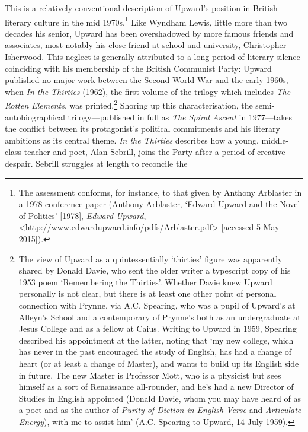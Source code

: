 \documentclass[]{article}
\begin{document}
\noindent This is a relatively conventional description of Upward’s
position in British literary culture in the mid 1970s.\footnote{The
  assessment conforms, for instance, to that given by Anthony Arblaster
  in a 1978 conference paper (Anthony Arblaster, ‘Edward Upward and the
  Novel of Politics’ {[}1978{]}, \emph{Edward Upward},
  \textless{}http://www.edwardupward.info\slash pdfs\slash Arblaster.pdf\textgreater{}
  {[}accessed 5 May 2015{]}).} Like Wyndham Lewis, little more than two
decades his senior, Upward has been overshadowed by more famous friends
and associates, most notably his close friend at school and university,
Christopher Isherwood. This neglect is generally attributed to a long
period of literary silence coinciding with his membership of the British
Communist Party: Upward published no major work between the Second World
War and the early 1960s, when \emph{In the Thirties} (1962), the first
volume of the trilogy which includes \emph{The Rotten Elements}, was
printed.\footnote{The view of Upward as a quintessentially ‘thirties’
  figure was apparently shared by Donald Davie, who sent the older
  writer a typescript copy of his 1953 poem ‘Remembering the Thirties’.
  Whether Davie knew Upward personally is not clear, but there is at
  least one other point of personal connection with Prynne, via A.C.
  Spearing, who was a pupil of Upward’s at Alleyn’s School and a
  contemporary of Prynne’s both as an undergraduate at Jesus College and
  as a fellow at Caius. Writing to Upward in 1959, Spearing described
  his appointment at the latter, noting that ‘my new college, which has
  never in the past encouraged the study of English, has had a change of
  heart (or at least a change of Master), and wants to build up its
  English side in future. The new Master is Professor Mott, who is a
  physicist but sees himself as a sort of Renaissance all-rounder, and
  he’s had a new Director of Studies in English appointed (Donald Davie,
  whom you may have heard of as a poet and as the author of \emph{Purity
  of Diction in English Verse} and \emph{Articulate Energy}), with me to
  assist him’ (A.C. Spearing to Upward, 14 July 1959).} Shoring up this
characterisation, the semi-autobiographical trilogy—published in full as
\emph{The Spiral Ascent} in 1977—takes the conflict between its
protagonist’s political commitments and his literary ambitions as its
central theme. \emph{In the Thirties} describes how a young,
middle-class teacher and poet, Alan Sebrill, joins the Party after a
period of creative despair. Sebrill struggles at length to reconcile the
\end{document}
